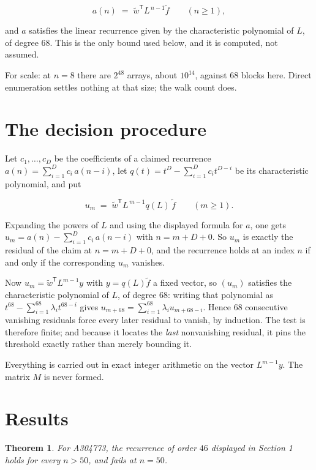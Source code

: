 \documentclass[11pt]{article}
\newtheorem{theorem}{Theorem}
\theoremstyle{definition}
\begin{document}
\[a(n) \;=\; \tilde w^{\mathsf T} L^{\,n-1} \tilde f \qquad (n \ge 1),\]

and $a$ satisfies the linear recurrence given by the characteristic polynomial of $L$, of degree $68$. This is the only bound used below, and it is computed, not assumed.

For scale: at $n = 8$ there are $2^{48}$ arrays, about $10^{14}$, against $68$ blocks here. Direct enumeration settles nothing at that size; the walk count does.

\section{The decision procedure}

Let $c_1,\dots,c_D$ be the coefficients of a claimed recurrence $a(n) = \sum_{i=1}^{D} c_i\,a(n-i)$, let $q(t) = t^{D} - \sum_{i=1}^{D} c_i t^{D-i}$ be its characteristic polynomial, and put

\[u_m \;=\; \tilde w^{\mathsf T} L^{\,m-1} q(L)\,\tilde f \qquad (m \ge 1).\]

Expanding the powers of $L$ and using the displayed formula for $a$, one gets $u_m = a(n) - \sum_{i=1}^{D} c_i\,a(n-i)$ with $n = m + D + 0$. So $u_m$ is exactly the residual of the claim at $n = m + D + 0$, and the recurrence holds at an index $n$ if and only if the corresponding $u_m$ vanishes.

Now $u_m = \tilde w^{\mathsf T} L^{m-1} y$ with $y = q(L)\tilde f$ a fixed vector, so $(u_m)$ satisfies the characteristic polynomial of $L$, of degree $68$: writing that polynomial as $t^{68} - \sum_{i=1}^{68} \lambda_i t^{68-i}$ gives $u_{m+68} = \sum_{i=1}^{68} \lambda_i u_{m+68-i}$. Hence $68$ consecutive vanishing residuals force every later residual to vanish, by induction. The test is therefore finite; and because it locates the {\itshape last} nonvanishing residual, it pins the threshold exactly rather than merely bounding it.

Everything is carried out in exact integer arithmetic on the vector $L^{m-1}y$. The matrix $M$ is never formed.

\section{Results}

\begin{theorem} For A304773, the recurrence of order $46$ displayed in Section 1 holds for every $n > 50$, and fails at $n = 50$.\end{theorem}
\end{document}
